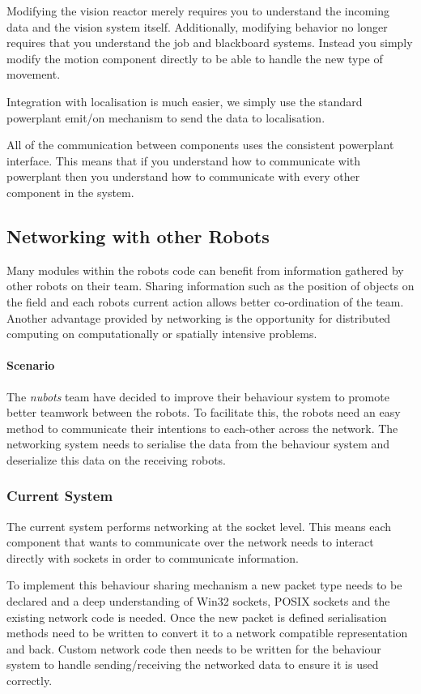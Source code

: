 \documentclass[english,12pt]{scrartcl}
\begin{document}
				Modifying the vision \gls{reactor} merely requires you to understand the incoming data and the vision system itself.
				Additionally, modifying behavior no longer requires that you understand the job and blackboard systems. 
				Instead you simply modify the motion component directly to be able to handle the new type of movement.

				Integration with localisation is much easier, we simply use the standard \gls{powerplant} emit/on mechanism to send the data to localisation.
				
				All of the communication between components uses the consistent \gls{powerplant} interface. This means that if you
				understand how to communicate with \gls{powerplant} then you understand how to communicate with every other component
				in the system.

		\subsection{Networking with other Robots}
			Many modules within the robots code can benefit from information gathered by other robots on their team. Sharing information such as the position of objects on the field and each robots current action allows better co-ordination of the team. Another advantage provided by networking
			is the opportunity for distributed computing on computationally or spatially intensive problems.
			
			\paragraph{Scenario} The \emph{\gls{nubots}} team have decided to improve their behaviour system to promote better teamwork between the robots. To facilitate this, the robots need an easy method to communicate their intentions to each-other across the network. The networking
			system needs to serialise the data from the behaviour system and deserialize this data on the receiving robots.
			
			\subsubsection{Current System}
				The current system performs networking at the socket level. This means each component
				that wants to communicate over the network needs to interact directly with sockets in order
				to communicate information.
				
				To implement this behaviour sharing mechanism a new packet type needs to be declared and a deep
				understanding of Win32 sockets, POSIX sockets and the existing network code is needed. Once the new
				packet is defined serialisation methods need to be written to convert it to a network compatible representation
				and back. Custom network code then needs to be written for the behaviour system to handle sending/receiving the
				networked data to ensure it is used correctly.
				
\end{document}
